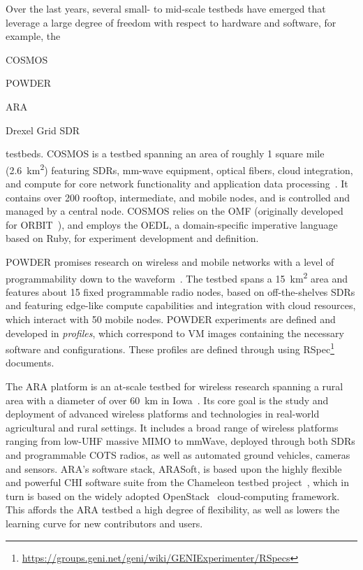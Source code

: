 Over the last years, several small- to mid-scale testbeds have emerged that leverage a large degree of freedom with respect to hardware and software, for example, the
\begin{enumerate*}[itemjoin={{, }}, itemjoin*={{, and }}]
    \item \gls{COSMOS}
    \item \gls{POWDER}
    \item \gls{ARA}
    \item Drexel Grid \gls{SDR}
\end{enumerate*} testbeds.
\gls{COSMOS} is a testbed spanning an area of roughly \num{1} square mile (\SI{2.6}{\kilo\meter\squared}) featuring \glspl{SDR}, \si{\milli\meter}-wave equipment, optical fibers, cloud integration, and compute for core network functionality and application data processing~\cite{Cosmos1,cosmos2}.
It contains over \num{200} rooftop, intermediate, and mobile nodes, and is controlled and managed by a central node.
\gls{COSMOS} relies on the \gls{OMF} (originally developed for ORBIT~\cite{orbit}), and employs the \gls{OEDL}, a domain-specific imperative language based on Ruby, for experiment development and definition.

\gls{POWDER} promises research on wireless and mobile networks with a level of programmability down to the waveform~\cite{powder}.
The testbed spans a \SI{15}{\kilo\meter\squared} area and features about \num{15} fixed programmable radio nodes, based on off-the-shelves \glspl{SDR} and featuring edge-like compute capabilities and integration with cloud resources, which interact with \num{50} mobile nodes.
\gls{POWDER} experiments are defined and developed in \emph{profiles}, which correspond to \gls{VM} images containing the necessary software and configurations.
These profiles are defined through using \gls{RSpec}\footnote{\url{https://groups.geni.net/geni/wiki/GENIExperimenter/RSpecs}} documents.

The \gls{ARA} platform is an at-scale testbed for wireless research spanning a rural area with a diameter of over \SI{60}{\kilo\meter} in Iowa~\cite{zhang2022ara}.
Its core goal is the study and deployment of advanced wireless platforms and technologies in real-world agricultural and rural settings.
It includes a broad range of wireless platforms ranging from low-\gls{UHF} massive \gls{MIMO} to \unit{\milli\meter}Wave, deployed through both \glspl{SDR} and programmable \gls{COTS} radios, as well as automated ground vehicles, cameras and sensors.
\gls{ARA}'s software stack, ARASoft, is based upon the highly flexible and powerful \gls{CHI} software suite from the Chameleon testbed project~\cite{keahey2020lessons}, which in turn is based on the widely adopted OpenStack~\cite{openstack} cloud-computing framework.
This affords the \gls{ARA} testbed a high degree of flexibility, as well as lowers the learning curve for new contributors and users.

